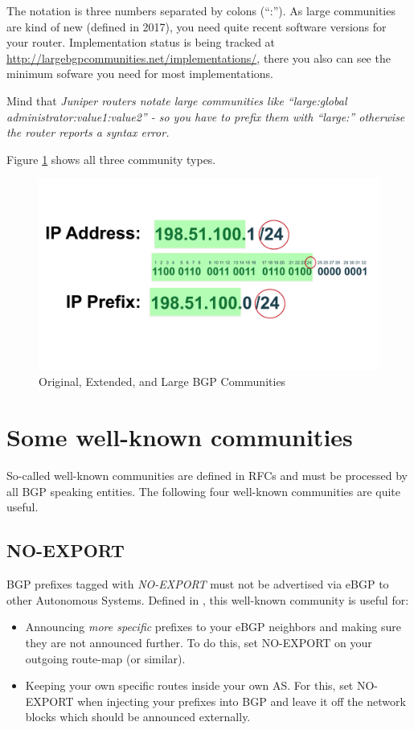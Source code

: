 The notation is three numbers separated by colons (``:''). As large communities are kind of new (defined in 2017), you need quite recent software versions for your router. Implementation status is being tracked at \url{http://largebgpcommunities.net/implementations/}, there you also can see the minimum sofware you need for most implementations.

Mind that \em{Juniper} routers notate large communities like ``large:global administrator:value1:value2'' - so you have to prefix them with ``large:'' otherwise the router reports a syntax error.

Figure \ref{fig:communities} shows all three community types.

\begin{figure}
  \centering
  \includegraphics[width=\linewidth,page=5]{img/Drawings.pdf}
  \caption{Original, Extended, and Large BGP Communities}
  \label{fig:communities}
\end{figure}


\section{Some well-known communities}
\label{wellknown}
So-called well-known communities are defined in RFCs and must be processed by all BGP speaking entities. The following four well-known communities are quite useful.

\subsection{NO-EXPORT}
BGP prefixes tagged with \emph{NO-EXPORT} must not be advertised via eBGP to other Autonomous Systems. Defined in \cite{rfc1997}, this well-known community is useful for:
\begin{itemize}
  \item Announcing \emph{more specific} prefixes to your eBGP neighbors and making sure they are not announced further. To do this, set NO-EXPORT on your outgoing route-map (or similar).
  \item Keeping your own specific routes inside your own AS. For this, set NO-EXPORT when injecting your prefixes into BGP and leave it off the network blocks which should be announced externally.
\end{itemize}

